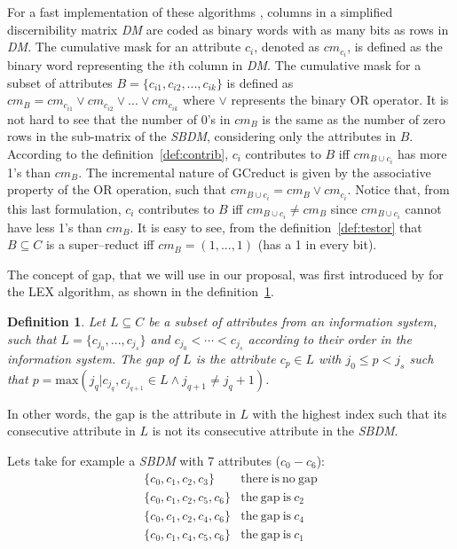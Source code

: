 \documentclass[authoryear,preprint,review,12pt]{elsarticle}
\newtheorem{definition}{Definition}
\begin{document}
	For a fast implementation of these algorithms \citep{Sanchez10,Lias13}, columns in a simplified discernibility matrix \textit{DM} are coded as binary words with as many bits as rows in \textit{DM}. The cumulative mask for an attribute $c_i$, denoted as $cm_{c_i}$, is defined as the binary word representing the $i$th column in \textit{DM}. The cumulative mask for a subset of attributes $B=\lbrace c_{i1},c_{i2},...,c_{ik} \rbrace$ is defined	as $cm_B = cm_{c_{i1}} \vee cm_{c_{i2}} \vee ... \vee cm_{c_{ik}}$ where $\vee$ represents the binary OR operator. It is not hard to see that the number of 0's in $cm_B$ is the same as the number of zero rows in the sub-matrix of the \textit{SBDM}, considering only the attributes in $B$. 
	According to the definition~\ref{def:contrib}, $c_i$ contributes to $B$ iff $cm_{B\cup c_i}$ has more 1's than 
	$cm_B$. The incremental nature of GCreduct is given by the associative property of the OR operation, such that 
	$cm_{B\cup c_i}=cm_B\vee cm_{c_i}$. Notice that, from this last formulation, $c_i$ contributes to $B$ iff 
	$cm_{B\cup c_i}\neq cm_B$ since $cm_{B\cup c_i}$ cannot have less 1's than $cm_B$. It is easy to see, from the
	definition~\ref{def:testor} that $B \subseteq C$ is a super--reduct iff $cm_B=(1,...,1)$ (has a 1 in every bit).

	The concept of gap, that we will use in our proposal, was first introduced by \cite{Santiesteban03} for 
	the LEX algorithm, as shown in the definition~\ref{def:gap}.
	
	\begin{definition}\label{def:gap}
		Let $L \subseteq C$ be a subset of attributes from an information system, such that $L = \lbrace c_{j_0},...,c_{j_s}
		\rbrace$ and $c_{j_0}<\cdots <c_{j_s}$ according to their order in the information system. The gap of $L$ is the
		attribute $c_p \in L$ with $j_0 \leq p <	j_s$ such that $p=\mathrm{max}(j_q | c_{j_q},c_{j_{q+1}} \in 
		L \wedge j_{q+1} \neq j_q+1)$.
	\end{definition}
	
	In other words, the gap is the attribute in $L$ with the highest index such that its consecutive attribute in $L$ is not its consecutive attribute in the \textit{SBDM}.
	
	Lets take for example a \textit{SBDM} with 7 attributes ($c_0 - c_6$):
	$$\begin{array}{ll}
	\lbrace c_0,c_1,c_2,c_3\rbrace 		& \mathrm{there~is~no~gap}\\
	\lbrace c_0,c_1,c_2,c_5,c_6\rbrace 	& \mathrm{the~gap~is~} c_2\\
	\lbrace c_0,c_1,c_2,c_4,c_6\rbrace 	& \mathrm{the~gap~is~} c_4\\
	\lbrace c_0,c_1,c_4,c_5,c_6\rbrace 	& \mathrm{the~gap~is~} c_1
	\end{array}$$
\end{document}
